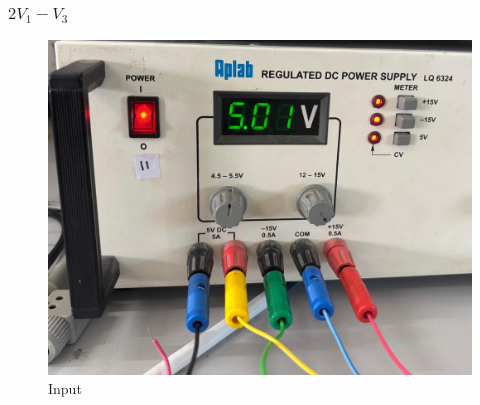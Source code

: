 \documentclass[a4paper,12pt]{article}
\begin{document}
\subsubsection*{$2V_1 - V_3$}
\begin{figure}[h!]
   \centering
   \includegraphics[scale = 0.2]{figs/input2.png}
   \caption{Input}
\end{figure}
\end{document}
